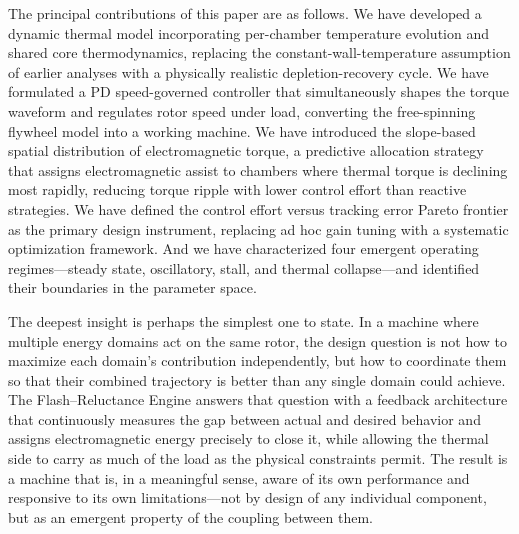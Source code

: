 \documentclass[11pt, a4paper]{article}
\theoremstyle{plain}
\theoremstyle{definition}
\begin{document}
The principal contributions of this paper are as follows. We have developed a dynamic thermal model incorporating per-chamber temperature evolution and shared core thermodynamics, replacing the constant-wall-temperature assumption of earlier analyses with a physically realistic depletion-recovery cycle. We have formulated a PD speed-governed controller that simultaneously shapes the torque waveform and regulates rotor speed under load, converting the free-spinning flywheel model into a working machine. We have introduced the slope-based spatial distribution of electromagnetic torque, a predictive allocation strategy that assigns electromagnetic assist to chambers where thermal torque is declining most rapidly, reducing torque ripple with lower control effort than reactive strategies. We have defined the control effort versus tracking error Pareto frontier as the primary design instrument, replacing ad hoc gain tuning with a systematic optimization framework. And we have characterized four emergent operating regimes---steady state, oscillatory, stall, and thermal collapse---and identified their boundaries in the parameter space.

The deepest insight is perhaps the simplest one to state. In a machine where multiple energy domains act on the same rotor, the design question is not how to maximize each domain's contribution independently, but how to coordinate them so that their combined trajectory is better than any single domain could achieve. The Flash--Reluctance Engine answers that question with a feedback architecture that continuously measures the gap between actual and desired behavior and assigns electromagnetic energy precisely to close it, while allowing the thermal side to carry as much of the load as the physical constraints permit. The result is a machine that is, in a meaningful sense, aware of its own performance and responsive to its own limitations---not by design of any individual component, but as an emergent property of the coupling between them.

\end{document}
